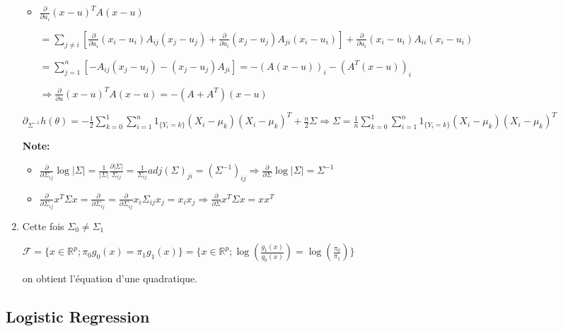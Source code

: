 \documentclass[10pt,a4paper,oneside]{article}
\begin{document}
\begin{enumerate}
\begin{itemize}
\item
$\frac{\partial}{\partial u_i} (x - u)^T A (x - u)$

$= \sum_{j \neq i} \left[ \frac{\partial}{\partial u_i} (x_i - u_i) A_{ij} (x_j - u_j) + \frac{\partial}{\partial u_i} (x_j - u_j) A_{ji} (x_i - u_i) \right] + \frac{\partial}{\partial u_i} (x_i - u_i) A_{ii} (x_i - u_i)$

$= \sum_{j = 1}^n \left[ -A_{ij} (x_j - u_j) - (x_j - u_j) A_{ji} \right] = -(A(x-u))_i - (A^T(x-u))_i$

$\Rightarrow \frac{\partial}{\partial u} (x-u)^T A (x-u) = -(A + A^T)(x-u)$
\end{itemize}

$\partial_{\Sigma^{-1}} h(\theta) = -\frac{1}{2} \sum_{k = 0}^1 \sum_{i = 1}^n 1_{\{ Y_i = k \}} (X_i - \mu_k) (X_i - \mu_k)^T + \frac{n}{2} \Sigma \Rightarrow \boxed{ \Sigma = \frac{1}{n} \sum_{k = 0}^1 \sum_{i = 1}^n 1_{\{ Y_i = k \}} (X_i - \mu_k) (X_i - \mu_k)^T }$

\textbf{Note:}
\begin{itemize}
\item
$\frac{\partial}{\partial \Sigma_{ij}} \log |\Sigma| = \frac{1}{|\Sigma|} \frac{\partial |\Sigma|}{\Sigma_{ij}} = \frac{1}{\Sigma_{ij}} adj(\Sigma)_{ji} = (\Sigma^{-1})_{ij} \Rightarrow \frac{\partial}{\partial \Sigma} \log |\Sigma| = \Sigma^{-1}$
\item
$\frac{\partial}{\partial \Sigma_{ij}} x^T \Sigma x = \frac{\partial}{\partial \Sigma_{ij}} = \frac{\partial}{\partial \Sigma_{ij}} x_i \Sigma_{ij} x_j = x_i x_j \Rightarrow \frac{\partial}{\partial \Sigma} x^T \Sigma x = x x^T$
\end{itemize}

\item
Cette fois $\Sigma_0 \neq \Sigma_1$

$\mathcal{F} = \{ x \in \mathbb{R}^p; \pi_0 g_0(x) = \pi_1 g_1(x) \} = \{ x \in \mathbb{R}^p; \log(\frac{g_1(x)}{g_0(x)}) = \log(\frac{\pi_0}{\pi_1}) \}$

on obtient l'équation d'une quadratique.

\end{enumerate}

\subsection{Logistic Regression}
\end{document}

